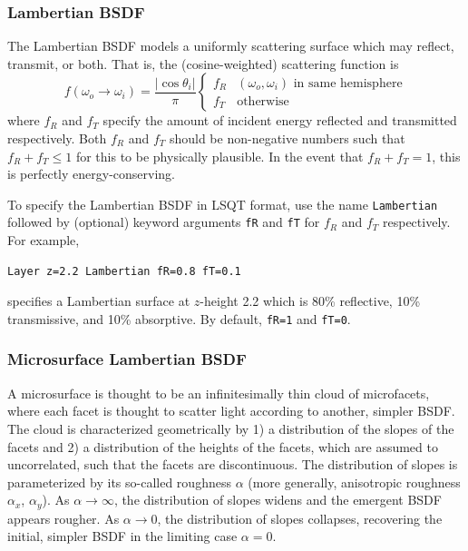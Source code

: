 \documentclass[
    twoside,
    twocolumn,
    letterpaper,
    10pt]{article}
\newcommand\namett[2]{{\color{code#1}\texttt{#2}}}
\begin{document}
\subsubsection{Lambertian BSDF}
\label{sec:doc-layers-lambertian}

The Lambertian BSDF models a uniformly scattering surface which 
may reflect, transmit, or both. That is, the (cosine-weighted)
scattering function is
\begin{equation*}
    f(\omega_o\to\omega_i) =
    \frac{|\cos{\theta_i}|}{\pi}
    \begin{cases}
        f_R & \text{$(\omega_o, \omega_i)$ in same hemisphere}\\
        f_T & \text{otherwise}
    \end{cases}
\end{equation*}
where $f_R$ and $f_T$ specify the amount of incident energy 
reflected and transmitted respectively. Both $f_R$ and $f_T$ should
be non-negative numbers such that $f_R + f_T \le 1$ for this to be
physically plausible. In the event that $f_R + f_T = 1$, this is
perfectly energy-conserving.

To specify the Lambertian BSDF in LSQT format, use the name
\namett{purple}{Lambertian} followed by (optional) keyword arguments 
\texttt{fR} and \texttt{fT} for $f_R$ and $f_T$ respectively. 
For example,
\begin{lstlisting}
Layer z=2.2 Lambertian fR=0.8 fT=0.1
\end{lstlisting}
specifies a Lambertian surface at $z$-height 2.2 which is 80\% reflective,
10\% transmissive, and 10\% absorptive. By default, \texttt{fR=1} and 
\texttt{fT=0}. %

\subsubsection{Microsurface Lambertian BSDF}
\label{sec:doc-layers-microsurface-lambertian}

A microsurface is thought 
to be an infinitesimally thin cloud of microfacets, where each facet 
is thought to scatter light according to another, simpler BSDF. The 
cloud is characterized geometrically by 1) a distribution of the
slopes of the facets and 2) a distribution of the heights of the facets,
which are assumed to uncorrelated, such that the facets are discontinuous. 
The distribution of slopes is parameterized by its so-called roughness
$\alpha$ (more generally, anisotropic roughness $\alpha_x$, $\alpha_y$).
As $\alpha\to\infty$, the distribution of slopes widens and the emergent
BSDF appears rougher. As $\alpha\to0$, the distribution of slopes collapses,
recovering the initial, simpler BSDF in the limiting case $\alpha=0$.
\end{document}

